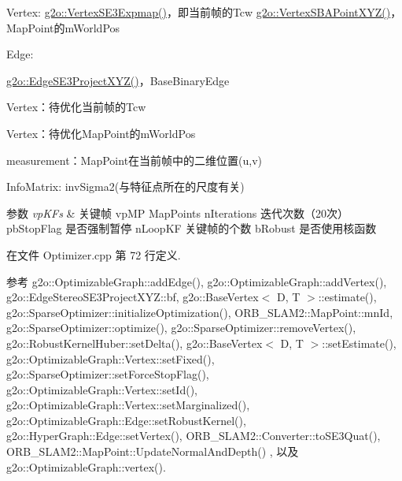 \begin{DoxyEnumerate}
\item Vertex\-: \hyperlink{classg2o_1_1VertexSE3Expmap}{g2o\-::\-Vertex\-S\-E3\-Expmap()}，即当前帧的\-Tcw \hyperlink{classg2o_1_1VertexSBAPointXYZ}{g2o\-::\-Vertex\-S\-B\-A\-Point\-X\-Y\-Z()}，\-Map\-Point的m\-World\-Pos
\item Edge\-:
\begin{DoxyItemize}
\item \hyperlink{classg2o_1_1EdgeSE3ProjectXYZ}{g2o\-::\-Edge\-S\-E3\-Project\-X\-Y\-Z()}，\-Base\-Binary\-Edge
\begin{DoxyItemize}
\item Vertex：待优化当前帧的\-Tcw
\item Vertex：待优化\-Map\-Point的m\-World\-Pos
\item measurement：\-Map\-Point在当前帧中的二维位置(u,v)
\item Info\-Matrix\-: inv\-Sigma2(与特征点所在的尺度有关)
\end{DoxyItemize}
\end{DoxyItemize}
\end{DoxyEnumerate}


\begin{DoxyParams}{参数}
{\em vp\-K\-Fs} & 关键帧 vp\-M\-P Map\-Points n\-Iterations 迭代次数（20次） pb\-Stop\-Flag 是否强制暂停 n\-Loop\-K\-F 关键帧的个数 b\-Robust 是否使用核函数 \\
\hline
\end{DoxyParams}


在文件 Optimizer.\-cpp 第 72 行定义.



参考 g2o\-::\-Optimizable\-Graph\-::add\-Edge(), g2o\-::\-Optimizable\-Graph\-::add\-Vertex(), g2o\-::\-Edge\-Stereo\-S\-E3\-Project\-X\-Y\-Z\-::bf, g2o\-::\-Base\-Vertex$<$ D, T $>$\-::estimate(), g2o\-::\-Sparse\-Optimizer\-::initialize\-Optimization(), O\-R\-B\-\_\-\-S\-L\-A\-M2\-::\-Map\-Point\-::mn\-Id, g2o\-::\-Sparse\-Optimizer\-::optimize(), g2o\-::\-Sparse\-Optimizer\-::remove\-Vertex(), g2o\-::\-Robust\-Kernel\-Huber\-::set\-Delta(), g2o\-::\-Base\-Vertex$<$ D, T $>$\-::set\-Estimate(), g2o\-::\-Optimizable\-Graph\-::\-Vertex\-::set\-Fixed(), g2o\-::\-Sparse\-Optimizer\-::set\-Force\-Stop\-Flag(), g2o\-::\-Optimizable\-Graph\-::\-Vertex\-::set\-Id(), g2o\-::\-Optimizable\-Graph\-::\-Vertex\-::set\-Marginalized(), g2o\-::\-Optimizable\-Graph\-::\-Edge\-::set\-Robust\-Kernel(), g2o\-::\-Hyper\-Graph\-::\-Edge\-::set\-Vertex(), O\-R\-B\-\_\-\-S\-L\-A\-M2\-::\-Converter\-::to\-S\-E3\-Quat(), O\-R\-B\-\_\-\-S\-L\-A\-M2\-::\-Map\-Point\-::\-Update\-Normal\-And\-Depth() , 以及 g2o\-::\-Optimizable\-Graph\-::vertex().



